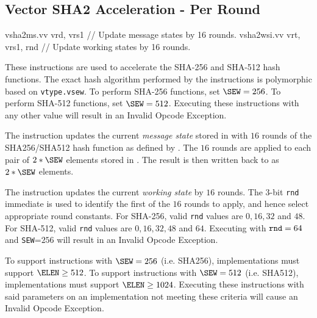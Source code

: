 \clearpage
\subsection{Vector SHA2 Acceleration - Per Round}
\label{sec:vector:sha2:per-round}

\begin{cryptoisa}
vsha2ms.vv  vrd, vrs1      // Update message states by 16 rounds.
vsha2wsi.vv vrt, vrs1, rnd // Update working states by 16 rounds.
\end{cryptoisa}

These instructions are used to accelerate the SHA-256 and SHA-512
hash functions.
The exact hash algorithm performed by the instructions is
polymorphic based on {\tt vtype.vsew}.
To perform SHA-256 functions, set $\SEW=256$.
To perform SHA-512 functions, set $\SEW=512$.
Executing these instructions with any other \SEW value will
result in an Invalid Opcode Exception.

The  instruction updates the current {\em message state}
stored in  with $16$ rounds of the SHA256/SHA512 hash function
as defined by \SEW.
The $16$ rounds are applied to each pair of $2*\SEW$
elements stored in .
The result is then written back to \vrd as $2*\SEW$ elements.

The  instruction updates the current {\em working state}
by $16$ rounds.
The $3$-bit {\tt rnd} immediate is used to identify the first of
the $16$ rounds to apply, and hence select appropriate round constants.
For SHA-256, valid {\tt rnd} values are $0, 16, 32$   and $48$.
For SHA-512, valid {\tt rnd} values are $0, 16, 32, 48$ and $64$.
Executing  with
${\tt rnd}=64$ 
and
{\tt SEW}=$256$
will result in an Invalid Opcode Exception.


To support  instructions with $\SEW=256$ (i.e. SHA256),
implementations must support $\ELEN \ge 512$.
To support  instructions with $\SEW=512$ (i.e. SHA512),
implementations must support $\ELEN \ge 1024$.
Executing these instructions with said parameters on an implementation
not meeting these criteria will cause an Invalid Opcode Exception.

